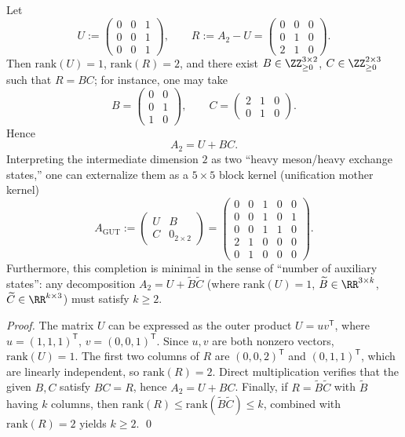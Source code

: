 \begin{proposition}\label{prop:pom-a2-gut-completion}
Let
\[
U:=
\begin{pmatrix}
0&0&1\\
0&0&1\\
0&0&1
\end{pmatrix},
\qquad
R:=A_2-U=
\begin{pmatrix}
0&0&0\\
0&1&0\\
2&1&0
\end{pmatrix}.
\]
Then \(\mathrm{rank}(U)=1\), \(\mathrm{rank}(R)=2\), and there exist \(B\in\ZZ_{\ge 0}^{3\times 2}\), \(C\in\ZZ_{\ge 0}^{2\times 3}\) such that \(R=BC\); for instance, one may take
\[
B=
\begin{pmatrix}
0&0\\
0&1\\
1&0
\end{pmatrix},
\qquad
C=
\begin{pmatrix}
2&1&0\\
0&1&0
\end{pmatrix}.
\]
Hence
\[
A_2=U+BC.
\]
Interpreting the intermediate dimension \(2\) as two ``heavy meson/heavy exchange states,'' one can externalize them as a \(5\times 5\) block kernel (unification mother kernel)
\[
A_{\mathrm{GUT}}
:=
\begin{pmatrix}
U & B\\
C & 0_{2\times 2}
\end{pmatrix}
=
\begin{pmatrix}
0&0&1&0&0\\
0&0&1&0&1\\
0&0&1&1&0\\
2&1&0&0&0\\
0&1&0&0&0
\end{pmatrix}.
\]
Furthermore, this completion is minimal in the sense of ``number of auxiliary states'': any decomposition \(A_2=U+\widetilde B\widetilde C\) (where \(\mathrm{rank}(U)=1\), \(\widetilde B\in\RR^{3\times k}\), \(\widetilde C\in\RR^{k\times 3}\)) must satisfy \(k\ge 2\).
\end{proposition}
\begin{proof}
The matrix \(U\) can be expressed as the outer product \(U=uv^{\mathsf T}\), where \(u=(1,1,1)^{\mathsf T}\), \(v=(0,0,1)^{\mathsf T}\). Since \(u, v\) are both nonzero vectors, \(\mathrm{rank}(U)=1\).
The first two columns of \(R\) are \((0,0,2)^{\mathsf T}\) and \((0,1,1)^{\mathsf T}\), which are linearly independent, so \(\mathrm{rank}(R)=2\).
Direct multiplication verifies that the given \(B,C\) satisfy \(BC=R\), hence \(A_2=U+BC\).
Finally, if \(R=\widetilde B\widetilde C\) with \(\widetilde B\) having \(k\) columns, then \(\mathrm{rank}(R)\le \mathrm{rank}(\widetilde B\widetilde C)\le k\), combined with \(\mathrm{rank}(R)=2\) yields \(k\ge 2\). \qed
\end{proof}

